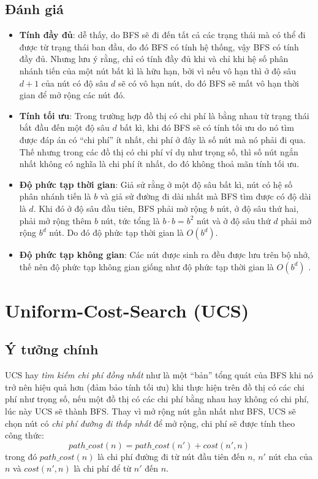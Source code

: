 \subsection{Đánh giá}

\begin{itemize}
    \item \textbf{Tính đầy đủ}: dễ thấy, do BFS sẽ đi đến tất cả các trạng thái mà có thể đi được từ trạng thái ban đầu, do đó BFS có tính hệ thống, vậy BFS có tính đầy đủ. Nhưng lưu ý rằng, chỉ có tính đầy đủ khi và chỉ khi hệ số phân nhánh tiến của một nút bất kì là hữu hạn, bởi vì nếu vô hạn thì ở độ sâu $d+1$ của nút có độ sâu $d$ sẽ có vô hạn nút, do đó BFS sẽ mất vô hạn thời gian để mở rộng các nút đó.

    \item \textbf{Tính tối ưu}: Trong trường hợp đồ thị có chi phí là bằng nhau từ trạng thái bắt đầu đến một độ sâu $d$ bất kì, khi đó BFS sẽ có tính tối ưu do nó tìm được đáp án có ``chi phí'' ít nhất, chi phí ở đây là số nút mà nó phải đi qua. Thế nhưng trong các đồ thị có chi phí ví dụ như trọng số, thì số nút ngắn nhất không có nghĩa là chi phí ít nhất, do đó không thoả mãn tính tối ưu.

    \item \textbf{Độ phức tạp thời gian}: Giả sử rằng ở một độ sâu bất kì, nút có hệ số phân nhánh tiến là $b$ và giả sử đường đi dài nhất mà BFS tìm được có độ dài là $d$. Khi đó ở độ sâu đầu tiên, BFS phải mở rộng $b$ nút, ở độ sâu thứ hai, phải mở rộng thêm $b$ nút, tức tổng là $b \cdot b = b^2$ nút và ở độ sâu thứ $d$ phải mở rộng $b^d$ nút. Do đó độ phức tạp thời gian là $O(b^d)$.

    \item \textbf{Độ phức tạp không gian}: Các nút được sinh ra đều được lưu trên bộ nhớ, thế nên độ phức tạp không gian giống như độ phức tạp thời gian là $O(b^d)$ \cite{LHB}.
\end{itemize}

\section{Uniform-Cost-Search (UCS)}

\subsection{Ý tưởng chính}

UCS hay \textit{tìm kiếm chi phí đồng nhất} như là một ``bản'' tổng quát của BFS khi nó trở nên hiệu quả hơn (đảm bảo tính tối ưu) khi thực hiện trên đồ thị có các chi phí như trọng số, nếu một đồ thị có các chi phí bằng nhau hay không có chi phí, lúc này UCS sẽ thành BFS. Thay vì mở rộng nút gần nhất như BFS, UCS sẽ chọn nút có \textit{chi phí đường đi thấp nhất} để mở rộng, chi phí sẽ được tính theo công thức:
$$
path\_cost(n) = path\_cost(n') + cost(n', n)
$$
trong đó $path\_cost(n)$ là chi phí đường đi từ nút đầu tiên đến $n$, $n'$ nút cha của $n$ và $cost(n',n)$ là chi phí để từ $n'$ đến $n$.
\vspace{7pt}

